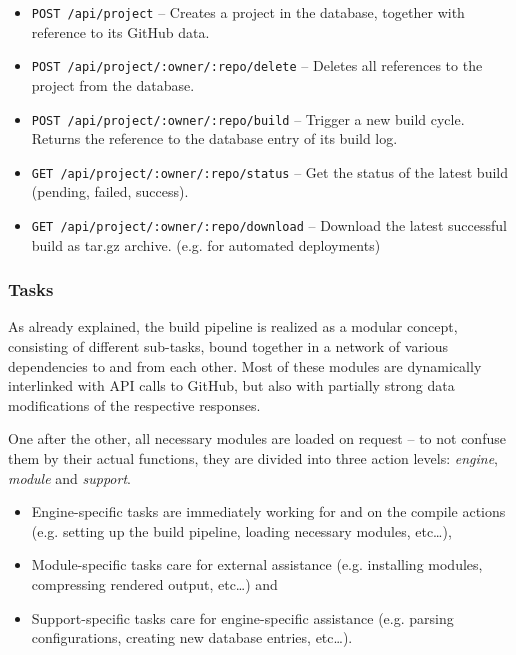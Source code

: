 \begin{itemize}
  \item \texttt{POST /api/project} -- Creates a project in the database, together with reference to its GitHub data.
  \item \texttt{POST /api/project/:owner/:repo/delete} -- Deletes all references to the project from the database.
  \item \texttt{POST /api/project/:owner/:repo/build} -- Trigger a new build cycle. Returns the reference to the database entry of its build log.
  \item \texttt{GET /api/project/:owner/:repo/status} -- Get the status of the latest build (pending, failed, success).
  \item \texttt{GET /api/project/:owner/:repo/download} -- Download the latest successful build as tar.gz archive. (e.g. for automated deployments)
\end{itemize}

\subsubsection{Tasks}
As already explained, the build pipeline is realized as a modular concept, consisting of different sub-tasks, bound together in a network of various dependencies to and from each other. Most of these modules are dynamically interlinked with API calls to GitHub, but also with partially strong data modifications of the respective responses.

One after the other, all necessary modules are loaded on request -- to not confuse them by their actual functions, they are divided into three action levels: \emph{engine}, \emph{module} and \emph{support}.

\begin{itemize}
  \item Engine-specific tasks are immediately working for and on the compile actions (e.g. setting up the build pipeline, loading necessary modules, etc\ldots),
  \item Module-specific tasks care for external assistance (e.g. installing modules, compressing rendered output, etc\ldots) and
  \item Support-specific tasks care for engine-specific assistance (e.g. parsing configurations, creating new database entries, etc\ldots).
\end{itemize}
